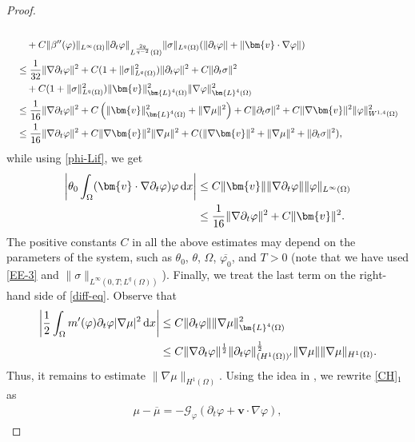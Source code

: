 \documentclass[11pt,reqno]{amsart}
\def\d{{\rm d}}
\def\vv{\bm{v}}
\begin{document}
\begin{proof}
\begin{align}
\notag\\
&\qquad +C\|\beta''(\varphi)\|_{L^\infty(\Omega)} \|\partial_t\varphi\|_{L^\frac{2q}{q-2}(\Omega)} \|\sigma\|_{L^q(\Omega)}
(\|\partial_t \varphi\| +\| \vv \cdot \nabla \varphi\|)
\notag\\
&\quad \leq \frac{1}{32}\|\nabla \partial_t \varphi\|^2+ C(1+\|\sigma\|_{L^q(\Omega)}^2)\|\partial_t\varphi\|^2
+ C\|\partial_t\sigma\|^2
\notag\\
&\qquad + C(1+\|\sigma\|_{L^q(\Omega)}^2) \|\vv\|_{\bm{L}^4(\Omega)}^2\|\nabla \varphi\|_{\bm{L}^4(\Omega)}^2
\notag\\
&\quad \leq \frac{1}{16}\|\nabla \partial_t \varphi\|^2
+ C \left( \| \vv\|_{\bm{L}^4(\Omega)}^2+ \| \nabla \mu\|^2 \right)
+ C\|\partial_t \sigma\|^2
+ C\|\nabla \vv\|^2\|\varphi\|_{W^{1,4}(\Omega)}^2
\notag\\
&\quad \leq \frac{1}{16}\|\nabla \partial_t \varphi\|^2
+ C\|\nabla \vv\|^2 \|\nabla \mu\|^2
+ C(\|\nabla \vv\|^2+\|\nabla \mu\|^2+\|\partial_t \sigma\|^2),
\notag
\end{align}
%
while using \eqref{phi-Lif}, we get
%
\begin{align*}
\left| \theta_0 \int_{\Omega} (\vv \cdot \nabla \partial_t \varphi) \varphi \, \d x\right|
&\leq C \| \vv\| \| \nabla \partial_t \varphi\| \| \varphi\|_{L^\infty(\Omega)} \\
&\leq \frac{1}{16} \| \nabla \partial_t \varphi\|^2 +
C \| \vv\|^2.
\notag
\end{align*}
%
The positive constants $C$ in all the above estimates may depend on the parameters of the system, such as $\theta_0$, $\theta$, $\Omega$, $\overline{\varphi_0}$, and $T>0$ (note that we have used \eqref{EE-3} and  $\|\sigma\|_{L^\infty(0,T;L^q(\Omega))}$).
%
Finally, we treat the last term on the right-hand side of \eqref{diff-eq}. Observe that
%
\begin{align}
\left| \frac12\int_\Omega m'(\varphi)\partial_t\varphi|\nabla \mu|^2\,\mathrm{d}x\right|
& \leq C\|\partial_t\varphi\|\|\nabla \mu\|_{\bm{L}^4(\Omega)}^2
\notag\\
&\leq C \| \nabla \partial_t \varphi\|^\frac12 \| \partial_t \varphi\|_{(H^1(\Omega))'}^\frac12
\|\nabla \mu\| \|\nabla \mu\|_{H^1(\Omega)}.
\label{es-lasta}
\end{align}
%
Thus, it remains to estimate $\|\nabla \mu\|_{H^1(\Omega)}$.
Using the idea in \cite{CGGG}, we rewrite \eqref{CH}$_1$ as
\begin{align}
\mu-\overline{\mu}= - \mathcal{G}_\varphi (\partial_t\varphi+\bm{v}\cdot\nabla \varphi),

\end{align}
\end{proof}
\end{document}
